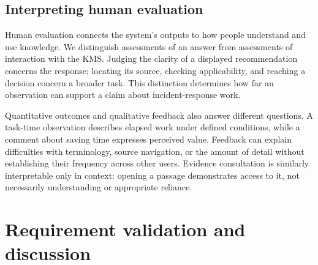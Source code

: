 \subsection{Interpreting human evaluation}

Human evaluation connects the system's outputs to how people understand and use knowledge. We distinguish assessments of an answer from assessments of interaction with the KMS. Judging the clarity of a displayed recommendation concerns the response; locating its source, checking applicability, and reaching a decision concern a broader task. This distinction determines how far an observation can support a claim about incident-response work.

Quantitative outcomes and qualitative feedback also answer different questions. A task-time observation describes elapsed work under defined conditions, while a comment about saving time expresses perceived value. Feedback can explain difficulties with terminology, source navigation, or the amount of detail without establishing their frequency across other users. Evidence consultation is similarly interpretable only in context: opening a passage demonstrates access to it, not necessarily understanding or appropriate reliance.


\section{Requirement validation and discussion}


